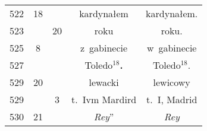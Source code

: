 \documentclass[a4paper,11pt]{article}
\numberwithin{equation}{section}
\begin{document}
\begin{center}
\begin{tabular}{|c|c|c|c|c|}
    522 & 18 & & kardynałem & kardynałem. \\
    523 & & 20 & roku & roku. \\
    525 & \hphantom{0}8 & & z~gabinecie & w~gabinecie \\
    527 & & & Toledo$^{ 18 }$\textbf{.} & Toledo$^{ 18 }$. \\
    529 & 20 & & lewacki & lewicowy \\
    529 & & \hphantom{0}3 & t.~Ivm Mardird & t.~I, Madrid \\
    530 & 21 & & \textit{Rey}” & \textit{Rey} \\
    \hline
  \end{tabular}





  \newpage


\end{center}
\end{document}
